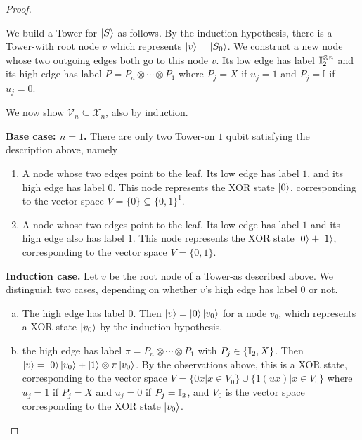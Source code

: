 \begin{proof}
\begin{enumerate}[(a)]
{                 We build a Tower-\limdd for $\ket S$ as follows.
                 By the induction hypothesis, there is a Tower-\limdd with root node $v$ which represents $\ket{v}=\ket{S_0}$.
                 We construct a new node whose two outgoing edges both go to this node $v$.
                 Its low edge has label $\id[2]^{\otimes n}$ and its high edge has label $P=P_n\otimes\cdots\otimes P_1$ where $P_j=X$ if $u_j=1$ and $P_j=\mathbb I$ if $u_j=0$.
             }
    \end{enumerate}

	We now show $\mathcal{V}_n\subseteq \mathcal X_n$, also by induction.
	
	\textbf{Base case: $n=1$.} There are only two Tower-\limdds on $1$ qubit satisfying the description above, namely
	\begin{enumerate}[(1)]
		\item A node whose two edges point to the leaf. Its low edge has label $1$, and its high edge has label $0$.
		This node represents the XOR state $\ket 0$, corresponding to the vector space $V=\{0\}\subseteq\{0,1\}^1$.
		\item A node whose two edges point to the leaf. Its low edge has label $1$ and its high edge also has label $1$.
		This node represents the XOR state $\ket 0+\ket 1$, corresponding to the vector space $V=\{0,1\}$.
	\end{enumerate}
	
	\textbf{Induction case. } Let $v$ be the root node of a Tower-\limdd as described above.
	We distinguish two cases, depending on whether $v$'s high edge has label $0$ or not.
	\begin{enumerate}[(a)]
		\item The high edge has label $0$.
		Then $\ket{v}=\ket{0}\ket{v_0}$ for a node $v_0$, which represents a XOR state $\ket{v_0}$ by the induction hypothesis.
    \item the high edge has label $\pi=P_n\otimes\cdots\otimes P_1$ with $P_j \in \{\id[2], X\}$.
		Then $\ket{v}=\ket 0\ket{v_0}+\ket{1}\otimes\pi\ket{v_0}$.
            By the observations above, this is a XOR state, corresponding to the vector space $V=\{0x|x\in V_0\}\cup \{1(ux)|x\in V_0\}$ where $u_j=1$ if $P_j=X$ and $u_j=0$ if $P_j=\id[2]$, and $V_0$ is the vector space corresponding to the XOR state $\ket{v_0}$.
	\end{enumerate}
\end{proof}

